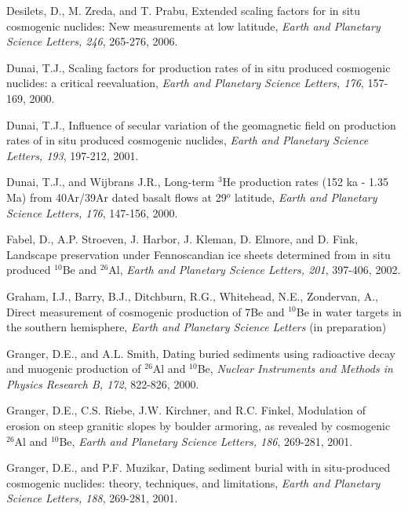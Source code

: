 \documentclass{article}
\begin{document}
\begin{description}
\item Desilets, D.,  M. Zreda, and T. Prabu,  Extended scaling factors
  for in  situ cosmogenic nuclides: New measurements  at low latitude,
  {\it Earth and Planetary Science Letters, 246}, 265-276, 2006.
  
\item Dunai,  T.J., Scaling  factors for production  rates of  in situ
  produced  cosmogenic nuclides: a  critical reevaluation,  {\it Earth
    and Planetary Science Letters, 176}, 157-169, 2000.
  
\item Dunai,  T.J., Influence of secular variation  of the geomagnetic
  field on  production rates of in situ  produced cosmogenic nuclides,
  {\it Earth and Planetary Science Letters, 193}, 197-212, 2001.
  
\item Dunai,  T.J., and Wijbrans J.R., Long-term  $^3$He production rates
  (152  ka -  1.35 Ma)  from 40Ar/39Ar  dated basalt  flows  at 29$^o$
  latitude, {\it  Earth and Planetary Science  Letters, 176}, 147-156,
  2000.
  
\item Fabel, D., A.P. Stroeven,  J. Harbor, J.  Kleman, D. Elmore, and
  D.   Fink,  Landscape preservation  under  Fennoscandian ice  sheets
  determined  from in  situ produced  $^{10}$Be  and $^{26}$Al,  {\it Earth  and
    Planetary Science Letters, 201}, 397-406, 2002.
  
\item  Graham, I.J.,  Barry, B.J.,  Ditchburn, R.G.,  Whitehead, N.E.,
  Zondervan, A.,  Direct measurement  of cosmogenic production  of 7Be
  and $^{10}$Be in water targets in the southern hemisphere, {\it Earth and
    Planetary Science Letters} (in preparation)
  
\item  Granger, D.E., and  A.L. Smith,  Dating buried  sediments using
  radioactive  decay and muogenic  production of  $^{26}$Al and  $^{10}$Be, {\it
    Nuclear  Instruments  and Methods  in  Physics  Research B,  172},
  822-826, 2000.

\item Granger,  D.E., C.S.  Riebe,  J.W.  Kirchner, and  R.C.  Finkel,
  Modulation of erosion on  steep granitic slopes by boulder armoring,
  as revealed  by cosmogenic $^{26}$Al  and $^{10}$Be, {\it Earth  and Planetary
    Science Letters, 186}, 269-281, 2001.
  
\item Granger, D.E., and P.F.  Muzikar, Dating sediment burial with in
  situ-produced   cosmogenic   nuclides:   theory,   techniques,   and
  limitations,  {\it  Earth   and  Planetary  Science  Letters,  188},
  269-281, 2001.


\end{description}
\end{document}
